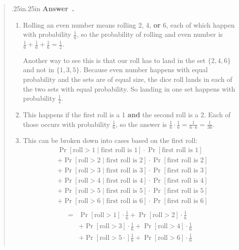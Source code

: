 \documentclass[12 pt]{article}
\newcounter{answer}[section]
\newenvironment{answer}{%
\refstepcounter{answer}
\par\bigskip 
\begin{quotation}{}{\leftmargin .25in\rightmargin .25in}
    \noindent \textbf{Answer~\thesection.\theanswer }  \rmfamily}
{\end{quotation}\par\bigskip}
\begin{document}
\begin{answer}
    \renewcommand{\labelenumi}{(\alph{enumi})} 
    \begin{enumerate}
        \item Rolling an even number means rolling 2, 4, \textbf{or} 6, each 
        of which happen with probability $\frac{1}{6}$, so the probability of 
        rolling and even number is $\frac{1}{6}+\frac{1}{6}+\frac{1}{6}=\frac{1}{2}$.

        Another way to see this is that our roll has to land in the set 
        $\{2,4,6\}$ and not in $\{1,3,5\}$. Because even number happens 
        with equal probability and the sets are of equal size, the dice 
        roll lands in each of the two sets with equal probability. So landing 
        in one set happens with probability $\frac{1}{2}$.
        \item This happens if the first roll is a 1 \textbf{and} the second roll 
        is a 2. Each of those occurs with probability $\frac{1}{6}$, so the 
        answer is $\frac{1}{6}\cdot \frac{1}{6} = \frac{1}{6\cdot6}=\frac{1}{36}$.
        \item This can be broken down into cases based on the first roll:
        \begin{align*}
            &\Pr[\text{roll} > 1 \mid \text{first roll is }1]\cdot\Pr[\text{first roll is }1]\\
            &+\Pr[\text{roll} > 2 \mid \text{first roll is }2]\cdot\Pr[\text{first roll is }2]\\
            &+\Pr[\text{roll} > 3 \mid \text{first roll is }3]\cdot\Pr[\text{first roll is }3]\\
            &+\Pr[\text{roll} > 4 \mid \text{first roll is }4]\cdot\Pr[\text{first roll is }4]\\
            &+\Pr[\text{roll} > 5 \mid \text{first roll is }5]\cdot\Pr[\text{first roll is }5]\\
            &+\Pr[\text{roll} > 6 \mid \text{first roll is }6]\cdot\Pr[\text{first roll is }6]\\
        \end{align*}
        \begin{align*}
            =&\Pr[\text{roll} > 1]\cdot \frac{1}{6}
            +\Pr[\text{roll} > 2]\cdot \frac{1}{6}\\
            &+\Pr[\text{roll} > 3]\cdot \frac{1}{6}
            +\Pr[\text{roll} > 4]\cdot \frac{1}{6}\\
            &+\Pr[\text{roll} > 5\cdot] \frac{1}{6}
            +\Pr[\text{roll} > 6]\cdot \frac{1}{6}\\

\end{align*}
\end{enumerate}
\end{answer}
\end{document}
